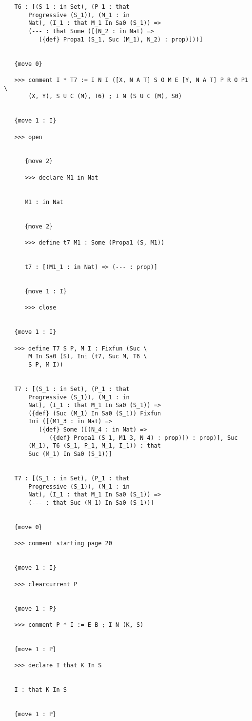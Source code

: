 \documentclass{article}
\begin{document}
\begin{verbatim}
   T6 : [(S_1 : in Set), (P_1 : that 
       Progressive (S_1)), (M_1 : in 
       Nat), (I_1 : that M_1 In Sa0 (S_1)) => 
       (--- : that Some ([(N_2 : in Nat) => 
          ({def} Propa1 (S_1, Suc (M_1), N_2) : prop)]))]


   {move 0}

   >>> comment I * T7 := I N I ([X, N A T] S O M E [Y, N A T] P R O P1 \
       (X, Y), S U C (M), T6) ; I N (S U C (M), S0)


   {move 1 : I}

   >>> open


      {move 2}

      >>> declare M1 in Nat


      M1 : in Nat


      {move 2}

      >>> define t7 M1 : Some (Propa1 (S, M1))


      t7 : [(M1_1 : in Nat) => (--- : prop)]


      {move 1 : I}

      >>> close


   {move 1 : I}

   >>> define T7 S P, M I : Fixfun (Suc \
       M In Sa0 (S), Ini (t7, Suc M, T6 \
       S P, M I))


   T7 : [(S_1 : in Set), (P_1 : that 
       Progressive (S_1)), (M_1 : in 
       Nat), (I_1 : that M_1 In Sa0 (S_1)) => 
       ({def} (Suc (M_1) In Sa0 (S_1)) Fixfun 
       Ini ([(M1_3 : in Nat) => 
          ({def} Some ([(N_4 : in Nat) => 
             ({def} Propa1 (S_1, M1_3, N_4) : prop)]) : prop)], Suc 
       (M_1), T6 (S_1, P_1, M_1, I_1)) : that 
       Suc (M_1) In Sa0 (S_1))]


   T7 : [(S_1 : in Set), (P_1 : that 
       Progressive (S_1)), (M_1 : in 
       Nat), (I_1 : that M_1 In Sa0 (S_1)) => 
       (--- : that Suc (M_1) In Sa0 (S_1))]


   {move 0}

   >>> comment starting page 20


   {move 1 : I}

   >>> clearcurrent P


   {move 1 : P}

   >>> comment P * I := E B ; I N (K, S)


   {move 1 : P}

   >>> declare I that K In S


   I : that K In S


   {move 1 : P}


\end{verbatim}
\end{document}
